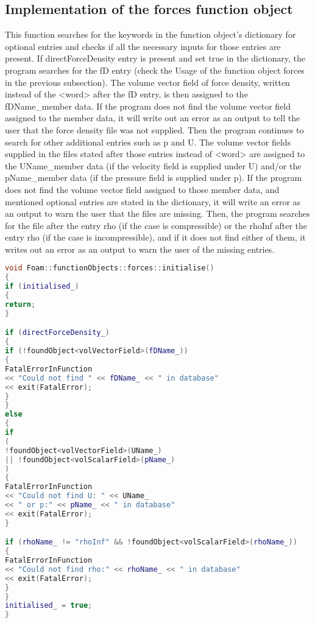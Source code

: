 \subsection{Implementation of the forces function object}
This function searches for the keywords in the function object’s dictionary for optional entries and checks if all the necessary inputs for those entries are present. If directForceDensity entry is present and set true in the dictionary, the program searches for the fD entry (check the Usage of the function object forces in the previous subsection). The volume vector field of force density, written instead of the <word> after the fD entry, is then assigned to the fDName\_member
data. If the program does not find the volume vector field assigned to the member data, it will write out an error as an output to tell the user that the force density file was not supplied. Then the program continues to search for other additional entries such as p and U. The volume vector fields supplied in the files stated after those entries instead of <word> are assigned to the UName\_member data (if the velocity field is supplied under U) and/or the pName\_member data (if the pressure field is supplied under p). If the program does not find the volume vector field assigned to those member data, and mentioned optional entries are stated in the dictionary, it will write an error as an output to warn the user that the files are missing. Then, the program searches for the file after the entry rho (if the case is compressible) or the rhoInf after the entry rho (if the case is incompressible),
and if it does not find either of them, it writes out an error as an output to warn the user of the missing entries.

\begin{lstlisting}[language=C++, caption=Member function \texttt{initialise()} in \texttt{forces.C} file]
void Foam::functionObjects::forces::initialise()
{
if (initialised_)
{
return;
}

if (directForceDensity_)
{
if (!foundObject<volVectorField>(fDName_))
{
FatalErrorInFunction
<< "Could not find " << fDName_ << " in database"
<< exit(FatalError);
}
}
else
{
if
(
!foundObject<volVectorField>(UName_)
|| !foundObject<volScalarField>(pName_)
)
{
FatalErrorInFunction
<< "Could not find U: " << UName_
<< " or p:" << pName_ << " in database"
<< exit(FatalError);
}

if (rhoName_ != "rhoInf" && !foundObject<volScalarField>(rhoName_))
{
FatalErrorInFunction
<< "Could not find rho:" << rhoName_ << " in database"
<< exit(FatalError);
}
}
initialised_ = true;
}
\end{lstlisting}

